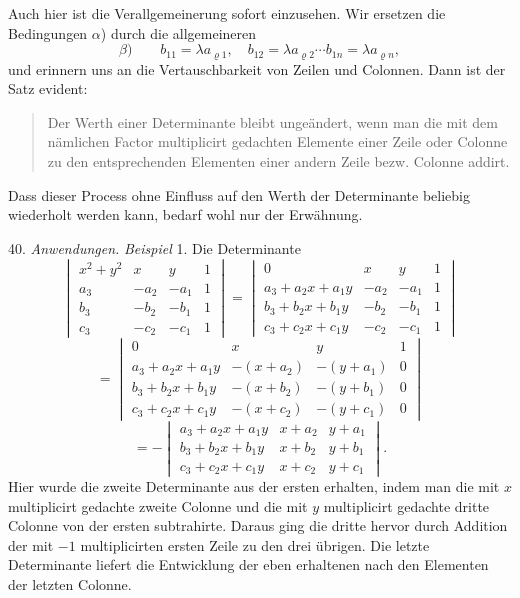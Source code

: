 Auch hier ist die Verallgemeinerung sofort einzusehen. Wir ersetzen die Bedingungen $\alpha$) durch die allgemeineren
\[
\beta)\qquad b_{11} = \lambda a_{\varrho 1}, \quad b_{12} = \lambda a_{\varrho 2} \cdots b_{1n} = \lambda a_{\varrho n},
\]
und erinnern uns an die Vertauschbarkeit von Zeilen und Colonnen. Dann ist der Satz evident:
\begin{quote}
\glqq Der Werth einer Determinante bleibt ungeändert, wenn man die mit dem nämlichen Factor multiplicirt gedachten Elemente einer Zeile oder Colonne zu den entsprechenden Elementen einer andern Zeile bezw. Colonne addirt.\grqq{}
\end{quote}
Dass dieser Process ohne Einfluss auf den Werth der Determinante beliebig wiederholt werden kann, bedarf wohl nur der Erwähnung.

40. \textit{Anwendungen.} \textit{Beispiel} 1. Die Determinante
\[
\begin{vmatrix} x^2+y^2 & x & y & 1\\ a_3 & -a_2 & -a_1 & 1\\ b_3 & -b_2 & -b_1 & 1\\ c_3 & -c_2 & -c_1 & 1\end{vmatrix}
= \begin{vmatrix} 0 & x & y & 1\\ a_3+a_2 x+a_1 y & -a_2 & -a_1 & 1\\ b_3+b_2 x+b_1 y & -b_2 & -b_1 & 1\\ c_3+c_2 x+c_1 y & -c_2 & -c_1 & 1\end{vmatrix}
\]
\[
= \begin{vmatrix} 0 & x & y & 1\\ a_3+a_2 x+a_1 y & -(x+a_2) & -(y+a_1) & 0\\ b_3+b_2 x+b_1 y & -(x+b_2) & -(y+b_1) & 0\\ c_3+c_2 x+c_1 y & -(x+c_2) & -(y+c_1) & 0\end{vmatrix}
\]
\[
= -\begin{vmatrix} a_3+a_2 x+a_1 y & x+a_2 & y+a_1\\ b_3+b_2 x+b_1 y & x+b_2 & y+b_1\\ c_3+c_2 x+c_1 y & x+c_2 & y+c_1\end{vmatrix}.
\]
Hier wurde die zweite Determinante aus der ersten erhalten, indem man die mit $x$ multiplicirt gedachte zweite Colonne und die mit $y$ multiplicirt gedachte dritte Colonne von der ersten subtrahirte. Daraus ging die dritte hervor durch Addition der mit $-1$ multiplicirten ersten Zeile zu den drei übrigen. Die letzte Determinante liefert die Entwicklung der eben erhaltenen nach den Elementen der letzten Colonne.

